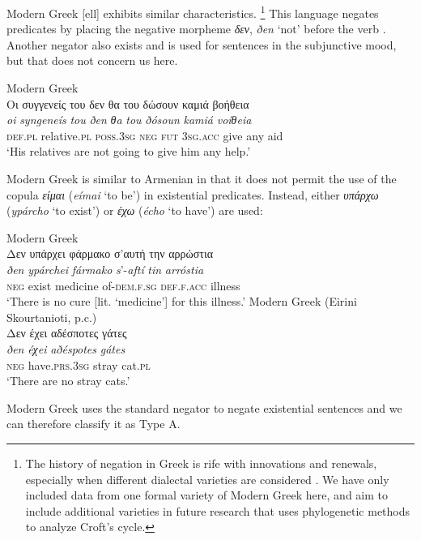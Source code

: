 \documentclass[output=paper,colorlinks,citecolor=brown]{langscibook}
\begin{document}
Modern Greek [ell] exhibits similar characteristics.%
%
\footnote{The history of negation in Greek is rife with innovations and
renewals, especially when different dialectal varieties are considered
\parencite[for example, see][]{KiparskyCondoravdi2006-ieur}. We have only included data from one formal variety of Modern Greek here, and aim to include additional varieties in future research that uses phylogenetic methods to analyze Croft's cycle.} 
%
This language negates predicates by placing the negative morpheme
\textit{δεν}, \textit{ðen} `not' before the verb
\parencite[510]{HoltonMackridge2012}. Another negator also exists and is
used for sentences in the subjunctive mood, but that does not concern us
here. 
%
\begin{exe}\ex
Modern Greek \parencite[510]{HoltonMackridge2012}\\
    \glll Οι συγγενείς του δεν θα του δώσουν καμιά βοήθεια \\
\textit{oi} \textit{syngeneís} \textit{tou} \textit{ðen} \textit{θa} \textit{tou} \textit{ðósoun} \textit{kamiá} \textit{voíθeia} \\
\textsc{def.pl} relative.\textsc{pl} \textsc{poss.3sg} \textsc{neg}
\textsc{fut} \textsc{3sg.acc} give any aid\\
    \glt `His relatives are not going to give him any help.' 
    \end{exe}
%
Modern Greek is similar to Armenian in that it does not permit the use of
the copula \textit{είμαι} (\textit{eímai} `to be') in existential
predicates. Instead, either \textit{υπάρχω} (\textit{ypárcho} `to exist')
or \textit{έχω} (\textit{écho} `to have') are used:
%
\begin{exe}\ex
Modern Greek \parencite[493]{HoltonMackridge2012}\\
    \glll Δεν υπάρχει φάρμακο σ'αυτή την αρρώστια \\
\textit{ðen} \textit{ypárchei} \textit{fármako} \textit{s}’-\textit{aftí} \textit{tin} \textit{arróstia} \\
\textsc{neg} exist medicine of-\textsc{dem.f.sg} \textsc{def.f.acc}
illness\\
    \glt
`There is no cure [lit. ‘medicine'] for this illness.' 
\ex
Modern Greek (Eirini Skourtanioti, p.c.)\\
    \glll Δεν έχει αδέσποτες γάτες\\
\textit{ðen} \textit{éχei} \textit{aðéspotes} \textit{gátes} \\
\textsc{neg}  have.\textsc{prs.3sg} stray cat.\textsc{pl}\\
    \glt `There are no stray cats.'
    \end{exe}
%
Modern Greek uses the standard negator to negate existential sentences and we can therefore classify it as Type A. 
\end{document}

